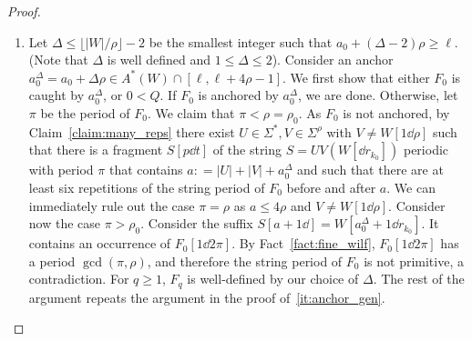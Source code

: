 \begin{proof}
\begin{enumerate}[label=\textrm{(\alph*)}]
\item Let $\Delta \le \lfloor |W|/\rho\rfloor-2$ be the smallest integer such that $a_0+(\Delta-2) \rho \ge \ell$. (Note that $\Delta$ is well defined and $1 \le \Delta \le 2$). Consider an anchor $a_0^\Delta = a_0+\Delta \rho \in A^\ast(W) \cap [\ell, \ell + 4\rho-1]$. We first show that either $F_0$ is caught by $a_0^\Delta$, or $0 < Q$. If $F_0$ is anchored by $a_0^\Delta$, we are done. Otherwise, let $\pi$ be the period of $F_0$. We claim that $\pi < \rho = \rho_0$. As $F_0$ is not anchored, by Claim~\ref{claim:many_reps} there exist $U \in \Sigma^\ast, V \in \Sigma^\rho$ with $V \neq W[1 \dd \rho]$ such that there is a fragment $S[p \dd t]$ of the string $S = UV(W[\dd r_{k_0}])$ periodic with period $\pi$ that contains $a: = |U|+|V|+a_0^\Delta$ and such that there are at least six repetitions of the string period of $F_0$ before and after $a$. We can immediately rule out the case $\pi = \rho$ as $a \leq 4\rho$ and $V \neq W[1 \dd \rho]$. Consider now the case $\pi > \rho_0$. Consider the suffix $S[a+1\dd] = W[a_0^\Delta+1 \dd r_{k_0}]$. It contains an occurrence of $F_0[1\dd 2 \pi]$. By Fact~\ref{fact:fine_wilf}, $F_0[1\dd 2 \pi]$ has a period $\gcd(\pi, \rho)$, and therefore the string period of $F_0$ is not primitive, a contradiction. For $q \ge 1$, $F_q$ is well-defined by our choice of $\Delta$. 
The rest of the argument repeats the argument in the proof of~\ref{it:anchor_gen}.
\end{enumerate}
\end{proof}
